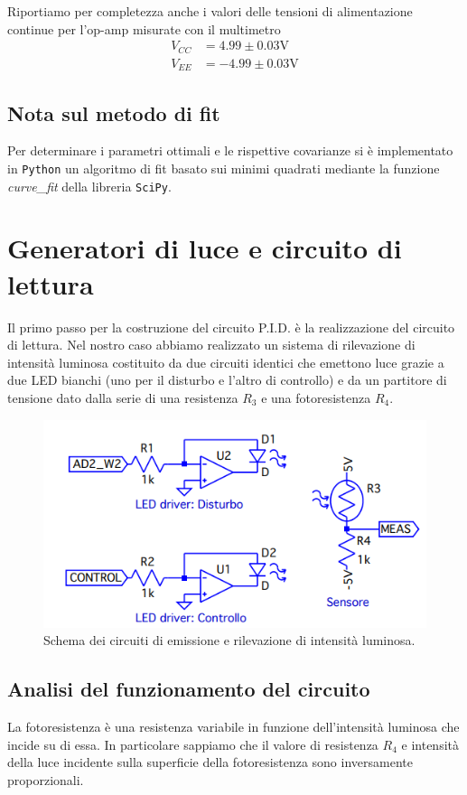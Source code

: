 \documentclass[10pt, a4paper, italian]{article}
\begin{document}
Riportiamo per completezza anche i valori delle tensioni di alimentazione
continue per l'op-amp misurate con il multimetro
\begin{align*}
V_{CC} &= 4.99 \pm 0.03 \si{\V} \\
V_{EE} &= -4.99 \pm 0.03 \si{\V}
\end{align*}

\subsection{Nota sul metodo di fit}
Per determinare i parametri ottimali e le rispettive covarianze si \`e
implementato in \verb+Python+ un algoritmo di fit basato sui minimi quadrati
mediante la funzione \emph{curve\_fit} della libreria \texttt{SciPy}.

\setcounter{section}{2}
\section{Generatori di luce e circuito di lettura}
Il primo passo per la costruzione del circuito P.I.D. è la realizzazione del
circuito di lettura. Nel nostro caso abbiamo realizzato un sistema di
rilevazione di intensità luminosa costituito da due circuiti identici che
emettono luce grazie a due LED bianchi (uno per il disturbo e l'altro di
controllo) e da un partitore di tensione dato dalla serie di una resistenza
$R_3$ e una fotoresistenza $R_4$.

\begin{figure}[htbp]
    \centering
	\includegraphics[scale=0.7]{noisegen}
    \caption{Schema dei circuiti di emissione e rilevazione di intensità
    luminosa.
    \label{schm: mesctrl}}
\end{figure}

\subsection{Analisi del funzionamento del circuito}
La fotoresistenza è una resistenza variabile in funzione dell'intensità
luminosa che incide su di essa. In particolare sappiamo che il valore di
resistenza $R_4$ e intensità della luce incidente sulla superficie della
fotoresistenza sono inversamente proporzionali.
\end{document}
